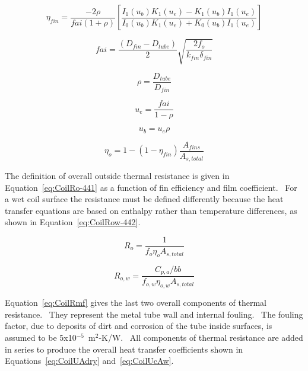 \begin{equation}
{\eta_{fin}} = \frac{{ - 2\rho }}{{fai(1 + \rho )}}\left[ {\frac{{{I_1}({u_b}){K_1}({u_e}) - {K_1}({u_b}){I_1}({u_e})}}{{{I_0}({u_b}){K_1}({u_e}) + {K_0}({u_b}){I_1}({u_e})}}} \right]
\label{eq:Coiletafin}
\end{equation}

\begin{equation}
fai = \frac{{({D_{fin}} - {D_{tube}})}}{2}\sqrt {\frac{{2{f_o}}}{{{k_{fin}}{\delta_{fin}}}}}
\label{eq:Coilfai}
\end{equation}

\begin{equation}
\rho  = \frac{{{D_{tube}}}}{{{D_{fin}}}}
\end{equation}

\begin{equation}
{u_e} = \frac{{fai}}{{1 - \rho }}
\end{equation}

\begin{equation}
{u_b} = {u_e}\rho
\label{eq:Coilub}
\end{equation}

\begin{equation}
{\eta_o} = 1 - (1 - {\eta_{fin}})\frac{{{A_{fins}}}}{{{A_{s,total}}}}
\label{eq:Coiletao}
\end{equation}

The definition of overall outside thermal resistance is given in Equation~\ref{eq:CoilRo-441} as a function of fin efficiency and film coefficient.~ For a wet coil surface the resistance must be defined differently because the heat transfer equations are based on enthalpy rather than temperature differences, as shown in Equation~\ref{eq:CoilRow-442}.

\begin{equation}
{R_o} = \frac{1}{{{f_o}{\eta_o}{A_{s,total}}}}
\label{eq:CoilRo-441}
\end{equation}

\begin{equation}
  R_{o,w} = \frac{C_{p,a}/bb}{f_{o,w}\eta_{o,w}A_{s,total}}
\label{eq:CoilRow-442}
\end{equation}

Equation~\ref{eq:CoilRmf} gives the last two overall components of thermal resistance.~ They represent the metal tube wall and internal fouling.~ The fouling factor, due to deposits of dirt and corrosion of the tube inside surfaces, is assumed to be 5x10\(^{-5}\)~m\(^2\)-K/W.~ All components of thermal resistance are added in series to produce the overall heat transfer coefficients shown in Equations~\ref{eq:CoilUAdry} and~\ref{eq:CoilUcAw}.


